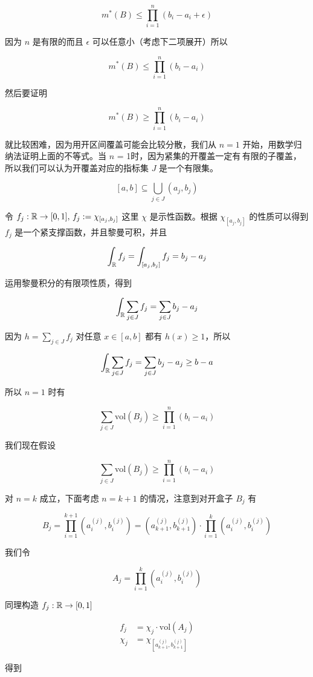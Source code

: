 \[
m^*(B) \le \prod_{i=1}^{n}(b_i - a_i + \epsilon)
\]

因为 $n$ 是有限的而且 $\epsilon$ 可以任意小（考虑下二项展开）所以


\[
m^*(B) \le \prod_{i=1}^{n}(b_i - a_i)
\]

然后要证明


\[
m^*(B) \ge \prod_{i=1}^{n}(b_i - a_i)
\]

就比较困难，因为用开区间覆盖可能会比较分散，我们从 $n = 1$ 开始，用数学归纳法证明上面的不等式。当 $n$ = 1时，因为紧集的开覆盖一定有\,有限的子覆盖，所以我们可以认为开覆盖对应的指标集 $J$ 是一个有限集。

\[
    [a,b] \subseteq \bigcup_{j \in J}(a_j, b_j)
\]

令 $f_j: \mathbb{R} \to [0,1],\, f_j := \chi_{[a_j, b_j]}$ 这里 $\chi$ 是示性函数。根据 $\chi_{[a_j, b_j]}$  的性质可以得到 $f_j$ 是一个紧支撑函数，并且黎曼可积，并且

\[
\int_{\mathbb{R}}f_j = \int_{[a_j, b_j]}f_j = b_j - a_j
\]

运用黎曼积分的有限项性质，得到

\[
\int_{\mathbb{R}} \sum_{j \in J} f_j = \sum_{j \in J}b_j - a_j
\]

因为 $h = \sum_{j \in J} f_j$ 对任意 $x \in [a,b]$ 都有 $h(x) \ge 1$，所以 

\[
\int_{\mathbb{R}} \sum_{j \in J} f_j = \sum_{j \in J}b_j - a_j \ge b -a
\]

所以 $n=1$ 时有

\[
\sum_{j \in J} \mathrm{vol}(B_j) \ge \prod_{i=1}^{n}(b_i - a_i)
\]

我们现在假设 


\[
\sum_{j \in J} \mathrm{vol}(B_j) \ge \prod_{i=1}^{n}(b_i - a_i)
\]

对 $n = k$ 成立，下面考虑 $n = k +1$ 的情况，注意到对开盒子 $B_j$ 有

\[
    B_j = \prod_{i=1}^{k+1}(a_i^{(j)}, b_i^{(j)}) = (a_{k+1}^{(j)}, b_{k+1}^{(j)}) \cdot \prod_{i=1}^{k}(a_i^{(j)}, b_i^{(j)})
\]

我们令 

\[
    A_j = \prod_{i=1}^{k}(a_i^{(j)}, b_i^{(j)})
\]

同理构造 $f_j: \mathbb{R} \to [0,1]$

\begin{align*}
    f_j &= \chi_{j}  \cdot \mathrm{vol}(A_j) \\
\chi_{j} &= \chi_{[a_{k+1}^{(j)}, b_{k+1}^{(j)}]}
\end{align*}

得到

